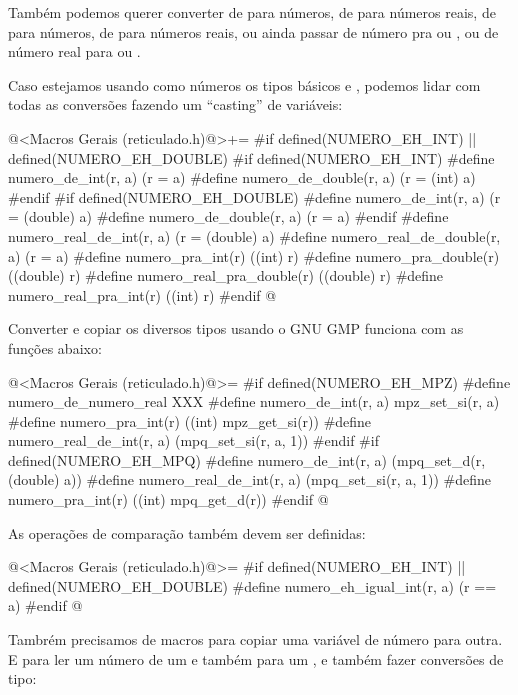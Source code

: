 



Também podemos querer converter de  para
números, de  para números reais,
de  para números, de  para
números reais, ou ainda passar de número pra 
ou , ou de número real para 
ou .

Caso estejamos usando como números os tipos básicos 
e , podemos lidar com todas as conversões fazendo
um ``casting'' de variáveis:

\iniciocodigo
@<Macros Gerais (reticulado.h)@>+=
#if defined(NUMERO_EH_INT) || defined(NUMERO_EH_DOUBLE)
#if defined(NUMERO_EH_INT)
#define numero_de_int(r, a) (r = a)%
#define numero_de_double(r, a) (r = (int) a)
#endif
#if defined(NUMERO_EH_DOUBLE)
#define numero_de_int(r, a) (r = (double) a)%
#define numero_de_double(r, a) (r = a)
#endif
#define numero_real_de_int(r, a) (r = (double) a)%
#define numero_real_de_double(r, a) (r = a)
#define numero_pra_int(r) ((int) r)%
#define numero_pra_double(r) ((double) r)
#define numero_real_pra_double(r) ((double) r)
#define numero_real_pra_int(r) ((int) r)
#endif
@
\fimcodigo

Converter e copiar os diversos tipos usando o GNU GMP funciona com as
funções abaixo:

\iniciocodigo
@<Macros Gerais (reticulado.h)@>=
#if defined(NUMERO_EH_MPZ)
#define numero_de_numero_real XXX
#define numero_de_int(r, a) mpz_set_si(r, a)
#define numero_pra_int(r) ((int) mpz_get_si(r))
#define numero_real_de_int(r, a) (mpq_set_si(r, a, 1))
#endif
#if defined(NUMERO_EH_MPQ)
#define numero_de_int(r, a) (mpq_set_d(r, (double) a))
#define numero_real_de_int(r, a) (mpq_set_si(r, a, 1))
#define numero_pra_int(r) ((int) mpq_get_d(r))
#endif
@
\fimcodigo




As operações de comparação também devem ser definidas:

\iniciocodigo
@<Macros Gerais (reticulado.h)@>=
#if defined(NUMERO_EH_INT) || defined(NUMERO_EH_DOUBLE)
#define numero_eh_igual_int(r, a) (r == a)
#endif
@
\fimcodigo


Tambrém precisamos de macros para copiar uma variável de número para
outra. E para ler um número de um  e também para
um , e também fazer conversões de tipo:






